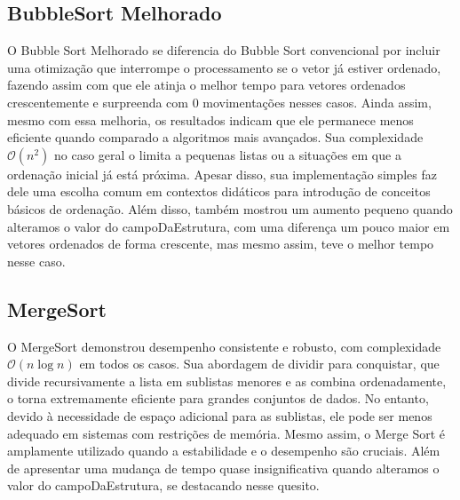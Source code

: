 \documentclass[a4paper, 12pt]{article}
\begin{document}
 \subsection{BubbleSort Melhorado}
 O Bubble Sort Melhorado se diferencia do Bubble Sort convencional por incluir uma otimização que interrompe o processamento se o vetor já estiver ordenado, fazendo assim com que ele atinja o melhor tempo para vetores ordenados crescentemente e surpreenda com 0 movimentações nesses casos. Ainda assim, mesmo com essa melhoria, os resultados indicam que ele permanece menos eficiente quando comparado a algoritmos mais avançados. Sua complexidade \( \mathcal{O}(n^2) \) no caso geral o limita a pequenas listas ou a situações em que a ordenação inicial já está próxima. Apesar disso, sua implementação simples faz dele uma escolha comum em contextos didáticos para introdução de conceitos básicos de ordenação. Além disso, também mostrou um aumento pequeno quando alteramos o valor do campoDaEstrutura, com uma diferença um pouco maior em vetores ordenados de forma crescente, mas mesmo assim, teve o melhor tempo nesse caso.

\subsection{MergeSort}
O MergeSort demonstrou desempenho consistente e robusto, com complexidade 
\( \mathcal{O}(n \log n) \) em todos os casos. Sua abordagem de dividir para conquistar, que divide recursivamente a lista em sublistas menores e as combina ordenadamente, o torna extremamente eficiente para grandes conjuntos de dados. No entanto, devido à necessidade de espaço adicional para as sublistas, ele pode ser menos adequado em sistemas com restrições de memória. Mesmo assim, o Merge Sort é amplamente utilizado quando a estabilidade e o desempenho são cruciais. Além de apresentar uma mudança de tempo quase insignificativa quando alteramos o valor do campoDaEstrutura, se destacando nesse quesito.
\end{document}
